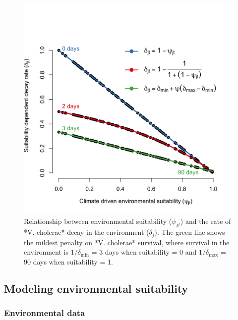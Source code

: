 \documentclass[
]{book}
\begin{document}
\begin{figure}

{\centering \includegraphics[width=0.8\linewidth]{figures/shedding_rate} 

}

\caption{Relationship between environmental suitability ($\psi_{jt}$) and the rate of *V. cholerae* decay in the environment ($\delta_j$). The green line shows the mildest penalty on *V. cholerae* survival, where survival in the environment is $1/\delta_{\text{min}}$ = 3 days when suitability = 0 and $1/\delta_{\text{max}}$ = 90 days when suitability = 1.}\label{fig:unnamed-chunk-1}
\end{figure}

\subsection{Modeling environmental suitability}\label{modeling-environmental-suitability}

\subsubsection{Environmental data}\label{environmental-data}
\end{document}
